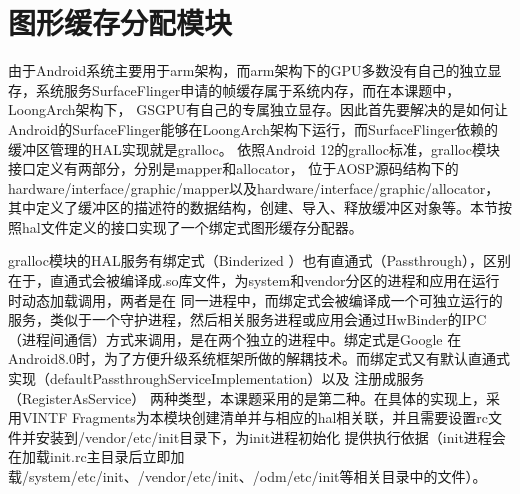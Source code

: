 







\section{图形缓存分配模块}
由于Android系统主要用于arm架构，而arm架构下的GPU多数没有自己的独立显存，系统服务SurfaceFlinger申请的帧缓存属于系统内存，而在本课题中，LoongArch架构下，
GSGPU有自己的专属独立显存。因此首先要解决的是如何让Android的SurfaceFlinger能够在LoongArch架构下运行，而SurfaceFlinger依赖的缓冲区管理的HAL实现就是gralloc。
依照Android 12的gralloc标准，gralloc模块接口定义有两部分，分别是mapper和allocator，
位于AOSP源码结构下的hardware/interface/graphic/mapper以及hardware/interface/graphic/allocator，
其中定义了缓冲区的描述符的数据结构，创建、导入、释放缓冲区对象等。本节按照hal文件定义的接口实现了一个绑定式图形缓存分配器。

gralloc模块的HAL服务有绑定式（Binderized ）也有直通式（Passthrough），区别在于，直通式会被编译成.so库文件，为system和vendor分区的进程和应用在运行时动态加载调用，两者是在
同一进程中，而绑定式会被编译成一个可独立运行的服务，类似于一个守护进程，然后相关服务进程或应用会通过HwBinder的IPC（进程间通信）方式来调用，是在两个独立的进程中。绑定式是Google
在Android8.0时，为了方便升级系统框架所做的解耦技术。而绑定式又有默认直通式实现（defaultPassthroughServiceImplementation）以及 注册成服务（RegisterAsService）
两种类型，本课题采用的是第二种。在具体的实现上，采用VINTF Fragments为本模块创建清单并与相应的hal相关联，并且需要设置rc文件并安装到/vendor/etc/init目录下，为init进程初始化
提供执行依据（init进程会在加载init.rc主目录后立即加载/system/etc/init、/vendor/etc/init、/odm/etc/init等相关目录中的文件）。


